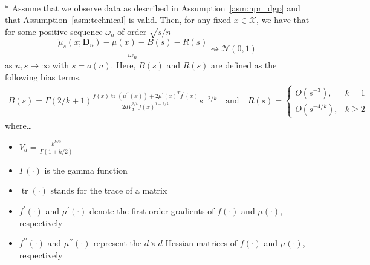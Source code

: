 \begin{boxD}
	\begin{thm}\label{thm:dem2}\mbox{}\\*
		Assume that we observe data as described in Assumption~\ref{asm:npr_dgp} and that Assumption~\ref{asm:technical} is valid.
		Then, for any fixed $x \in \mathcal{X}$, we have that for some positive sequence $\omega_n$ of order $\sqrt{s/n}$
		\begin{equation}
			\frac{\tilde{\mu}_{s}(x; \mathbf{D}_n) - \mu(x) - B(s) - R(s)}{\omega_n}
			\rightsquigarrow \mathcal{N}\left(0,1\right)
		\end{equation}
		as $n,s \rightarrow \infty$ with $s = o(n)$.
		Here, $B(s)$ and $R(s)$ are defined as the following bias terms.
		\begin{align}
			B(s)
			= \Gamma(2 / k+1) \frac{f(x) \operatorname{tr}\left(\mu^{\prime \prime}(x)\right)+2 \mu^{\prime}(x)^T f^{\prime}(x)}{2 d V_d^{2 / k} f(x)^{1+2 / k}} s^{-2 / k}
			\quad \text{and} \quad
			R(s) =
			\begin{cases}
				O\left(s^{-3}\right),     & k = 1      \\
				O\left(s^{-4 / k}\right), & k \geq 2
			\end{cases}
		\end{align}
		where\dots
		\begin{multicols}{2}
			\begin{itemize}
				\item $V_d=\frac{k^{k / 2}}{\Gamma(1+k / 2)}$
				\item $\Gamma(\cdot)$ is the gamma function
				\item $\operatorname{tr}(\cdot)$ stands for the trace of a matrix
				\item $f^{\prime}(\cdot)$ and $\mu^{\prime}(\cdot)$ denote the first-order gradients of $f(\cdot)$ and $\mu(\cdot)$, respectively
				\item $f^{\prime \prime}(\cdot)$ and $\mu^{\prime \prime}(\cdot)$ represent the $d \times d$ Hessian matrices of $f(\cdot)$ and $\mu(\cdot)$, respectively
			\end{itemize}
		\end{multicols}
	\end{thm}
\end{boxD}

